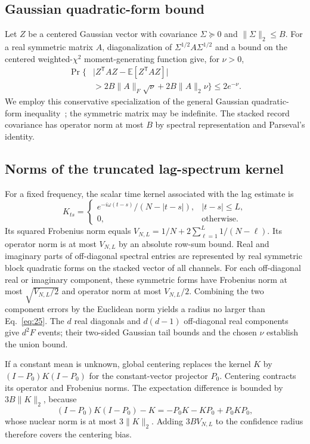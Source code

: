\subsection{Gaussian quadratic-form bound}
Let $Z$ be a centered Gaussian vector with covariance $\Sigma\succeq0$ and $\|\Sigma\|_2\le B$. For a real symmetric matrix $A$, diagonalization of $\Sigma^{1/2}A\Sigma^{1/2}$ and a bound on the centered weighted-$\chi^2$ moment-generating function give, for $\nu>0$,
\begin{equation}
\begin{aligned}
 \Pr\!\Big\{&\big|Z^\mathsf TAZ-\mathbb E[Z^\mathsf TAZ]\big|\\
 &>2B\|A\|_F\sqrt\nu+2B\|A\|_2\nu\Big\}\le2e^{-\nu}.
\end{aligned}
\end{equation}
We employ this conservative specialization of the general Gaussian quadratic-form inequality~\cite{hsu2012}; the symmetric matrix may be indefinite. The stacked record covariance has operator norm at most $B$ by spectral representation and Parseval's identity.

\subsection{Norms of the truncated lag-spectrum kernel}
For a fixed frequency, the scalar time kernel associated with the lag estimate is
\begin{equation}
 K_{ts}=\begin{cases}
  e^{-i\omega(t-s)}/(N-|t-s|),& |t-s|\le L,\\
  0,&\text{otherwise}.
 \end{cases}
\end{equation}
Its squared Frobenius norm equals $V_{N,L}=1/N+2\sum_{\ell=1}^L1/(N-\ell)$. Its operator norm is at most $V_{N,L}$ by an absolute row-sum bound. Real and imaginary parts of off-diagonal spectral entries are represented by real symmetric block quadratic forms on the stacked vector of all channels. For each off-diagonal real or imaginary component, these symmetric forms have Frobenius norm at most $\sqrt{V_{N,L}/2}$ and operator norm at most $V_{N,L}/2$. Combining the two component errors by the Euclidean norm yields a radius no larger than Eq.~\eqref{eq:25}. The $d$ real diagonals and $d(d-1)$ off-diagonal real components give $d^2F$ events; their two-sided Gaussian tail bounds and the chosen $\nu$ establish the union bound.

If a constant mean is unknown, global centering replaces the kernel $K$ by $(I-P_0)K(I-P_0)$ for the constant-vector projector $P_0$. Centering contracts its operator and Frobenius norms. The expectation difference is bounded by $3B\|K\|_2$, because
\begin{equation}
 (I-P_0)K(I-P_0)-K=-P_0K-KP_0+P_0KP_0,
\end{equation}
whose nuclear norm is at most $3\|K\|_2$. Adding $3BV_{N,L}$ to the confidence radius therefore covers the centering bias.

